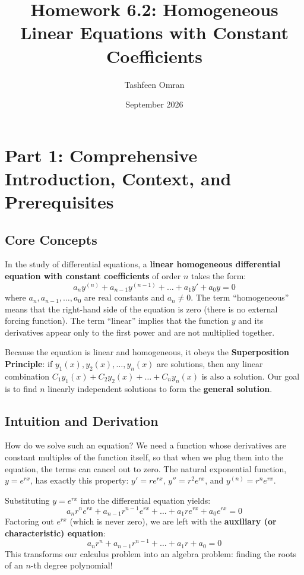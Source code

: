 \documentclass[11pt]{article}
\title{Homework 6.2: Homogeneous Linear Equations with Constant Coefficients}
\author{Tashfeen Omran}
\date{September 2026}
\begin{document}
\maketitle
\tableofcontents
\newpage

\section{Part 1: Comprehensive Introduction, Context, and Prerequisites}

\subsection{Core Concepts}
In the study of differential equations, a \textbf{linear homogeneous differential equation with constant coefficients} of order $n$ takes the form:
\[ a_n y^{(n)} + a_{n-1} y^{(n-1)} + \dots + a_1 y' + a_0 y = 0 \]
where $a_n, a_{n-1}, \dots, a_0$ are real constants and $a_n \neq 0$. The term ``homogeneous'' means that the right-hand side of the equation is zero (there is no external forcing function). The term ``linear'' implies that the function $y$ and its derivatives appear only to the first power and are not multiplied together.

Because the equation is linear and homogeneous, it obeys the \textbf{Superposition Principle}: if $y_1(x), y_2(x), \dots, y_n(x)$ are solutions, then any linear combination $C_1 y_1(x) + C_2 y_2(x) + \dots + C_n y_n(x)$ is also a solution. Our goal is to find $n$ linearly independent solutions to form the \textbf{general solution}.

\subsection{Intuition and Derivation}
How do we solve such an equation? We need a function whose derivatives are constant multiples of the function itself, so that when we plug them into the equation, the terms can cancel out to zero. The natural exponential function, $y = e^{rx}$, has exactly this property: $y' = r e^{rx}$, $y'' = r^2 e^{rx}$, and $y^{(n)} = r^n e^{rx}$.

Substituting $y = e^{rx}$ into the differential equation yields:
\[ a_n r^n e^{rx} + a_{n-1} r^{n-1} e^{rx} + \dots + a_1 r e^{rx} + a_0 e^{rx} = 0 \]
Factoring out $e^{rx}$ (which is never zero), we are left with the \textbf{auxiliary (or characteristic) equation}:
\[ a_n r^n + a_{n-1} r^{n-1} + \dots + a_1 r + a_0 = 0 \]
This transforms our calculus problem into an algebra problem: finding the roots of an $n$-th degree polynomial!
\end{document}
